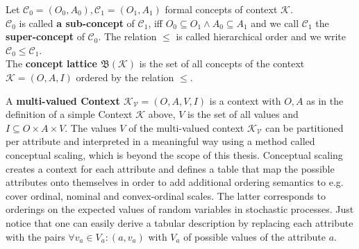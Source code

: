 Let $\mathcal{C}_0 = (O_0, A_0), \mathcal{C}_1 =(O_1, A_1)$ formal concepts of context $\mathcal{K}$.\\
$\mathcal{C}_0$ is called \textbf{a sub-concept} of $\mathcal{C}_1$, iff $O_0 \subseteq O_1 \wedge A_0 \subseteq A_1$ and we call $\mathcal{C}_1$ the \textbf{super-concept} of $\mathcal{C}_0$. The relation $\leq$ is called hierarchical order and we write $\mathcal{C}_0 \leq \mathcal{C}_1$.  \\
The \textbf{concept lattice $\mathfrak{B}(\mathcal{K})$} is the set of all concepts of the context $\mathcal{K} =(O, A, I)$ ordered by the relation $\leq$. \\


A \textbf{multi-valued Context $\mathcal{K_V} = (O, A, V, I)$} is a context with $O, A$ as in the definition of a simple Context $\mathcal{K}$ above, $V$ is the set of all values and $I \subseteq O \times A \times V$. The values $V$ of the multi-valued context $\mathcal{K_V}$ can be partitioned per attribute and interpreted in a meaningful way using a method called conceptual scaling, which is beyond the scope of this thesis. Conceptual scaling creates a context for each attribute and defines a table that map the possible attributes onto themselves in order to add additional ordering semantics to e.g. cover ordinal, nominal and convex-ordinal scales. The latter corresponds to orderings on the expected values of random variables in stochastic processes. Just notice that one can easily derive a tabular description by replacing each attribute with the pairs $\forall v_a \in V_a: (a, v_a)$ with $V_a$ of possible values of the attribute $a$. \\

